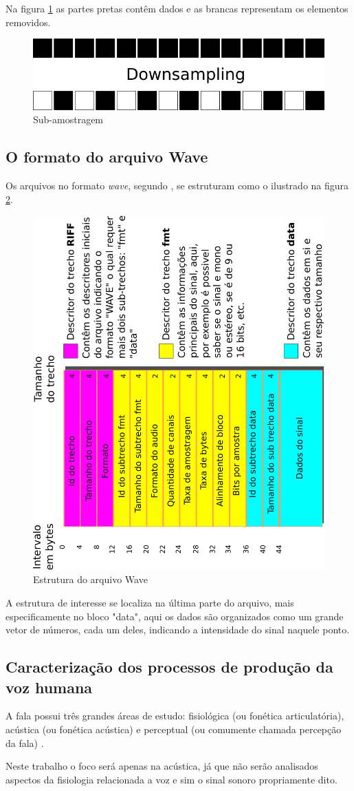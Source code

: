 			\par Na figura \ref{fig:downsampling} as partes pretas contêm dados e as brancas representam os elementos removidos.
			\begin{figure}[h]
				\centering
				\includegraphics[width=0.7\linewidth]{images/downsampling}
				\caption{Sub-amostragem}
				\label{fig:downsampling}
			\end{figure}
		\subsection{O formato do arquivo Wave}
			\par Os arquivos no formato \textit{wave}, segundo \cite{WAVE2019}, se estruturam como o ilustrado na figura \ref{fig:wavePcmStructure}.
		
			\begin{figure}[h]
				\centering
				\includegraphics[width=0.45\linewidth, angle=-90]{images/wavePcmStructure.pdf}
				\caption{Estrutura do arquivo Wave}
				\label{fig:wavePcmStructure}
			\end{figure}
			
			\par A estrutura de interesse se localiza na última parte do arquivo, mais especificamente no bloco "data", aqui os dados são organizados como um grande vetor de números, cada um deles, indicando a intensidade do sinal naquele ponto.
		\subsection{Caracterização dos processos de produção da voz humana}
			\par A fala possui três grandes áreas de estudo: fisiológica (ou fonética articulatória),  acústica  (ou fonética acústica)  e  perceptual  (ou  comumente  chamada percepção  da  fala) \cite{kremer2014eficiencia}.
			\par Neste trabalho o foco será apenas na acústica, já que não serão analisados aspectos da fisiologia relacionada a voz e sim o sinal sonoro propriamente dito.
			
